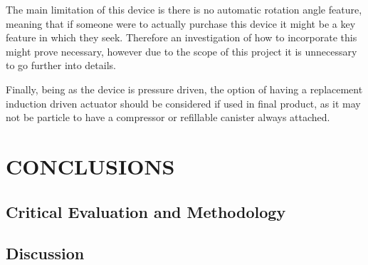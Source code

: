 \documentclass[a4paper, 10pt]{IEEEconf}
\begin{document}
The main limitation of this device is there is no automatic rotation angle feature, meaning that if someone were to actually purchase this device it might be a key feature in which they seek. Therefore an investigation of how to incorporate this might prove necessary, however due to the scope of this project it is unnecessary to go further into details.

Finally, being as the device is pressure driven, the option of having a replacement induction driven actuator should be considered if used in final product, as it may not be particle to have a compressor or refillable canister always attached.


\section{CONCLUSIONS}

\subsection{Critical Evaluation and Methodology}

%

\subsection{Discussion}

%
\end{document}
